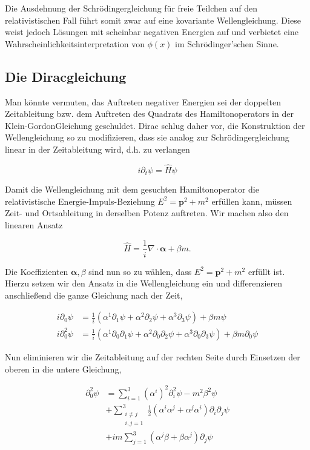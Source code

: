 \documentclass[10pt, letterpaper]{article}
\begin{document}
Die Ausdehnung der Schrödingergleichung für freie Teilchen auf den relativistischen Fall führt somit zwar auf eine kovariante Wellengleichung. Diese weist jedoch Lösungen mit scheinbar negativen Energien auf und verbietet eine Wahrscheinlichkeitsinterpretation von $\phi(x)$ im Schrödinger'schen Sinne.


\pagebreak



\subsection{Die Diracgleichung}
Man könnte vermuten, das Auftreten negativer Energien sei der doppelten Zeitableitung bzw. dem Auftreten des Quadrats des Hamiltonoperators in der Klein-GordonGleichung geschuldet. Dirac schlug daher vor, die Konstruktion der Wellengleichung so zu modifizieren, dass sie analog zur Schrödingergleichung linear in der Zeitableitung wird, d.h. zu verlangen

$$
i \partial_{t} \psi=\hat{H} \psi
$$

Damit die Wellengleichung mit dem gesuchten Hamiltonoperator die relativistische Energie-Impuls-Beziehung $E^{2}=\mathbf{p}^{2}+m^{2}$ erfüllen kann, müssen Zeit- und Ortsableitung in derselben Potenz auftreten. Wir machen also den linearen Ansatz

$$
\hat{H}=\frac{1}{i} \nabla \cdot \boldsymbol{\alpha}+\beta m .
$$

Die Koeffizienten $\boldsymbol{\alpha}, \beta$ sind nun so zu wählen, dass $E^{2}=\mathbf{p}^{2}+m^{2}$ erfüllt ist. Hierzu setzen wir den Ansatz in die Wellengleichung ein und differenzieren anschließend die ganze Gleichung nach der Zeit,

$$
\begin{aligned}
i \partial_{0} \psi & =\frac{1}{i}\left(\alpha^{1} \partial_{1} \psi+\alpha^{2} \partial_{2} \psi+\alpha^{3} \partial_{3} \psi\right)+\beta m \psi \\
i \partial_{0}^{2} \psi & =\frac{1}{i}\left(\alpha^{1} \partial_{0} \partial_{1} \psi+\alpha^{2} \partial_{0} \partial_{2} \psi+\alpha^{3} \partial_{0} \partial_{3} \psi\right)+\beta m \partial_{0} \psi
\end{aligned}
$$

Nun eliminieren wir die Zeitableitung auf der rechten Seite durch Einsetzen der oberen in die untere Gleichung,

$$
\begin{aligned}
\partial_{0}^{2} \psi & =\sum_{i=1}^{3}\left(\alpha^{i}\right)^{2} \partial_{i}^{2} \psi-m^{2} \beta^{2} \psi \\
& +\sum_{\substack{i \neq j \\
i, j=1}}^{3} \frac{1}{2}\left(\alpha^{i} \alpha^{j}+\alpha^{j} \alpha^{i}\right) \partial_{i} \partial_{j} \psi \\
& +i m \sum_{j=1}^{3}\left(\alpha^{j} \beta+\beta \alpha^{j}\right) \partial_{j} \psi
\end{aligned}
$$
\end{document}
